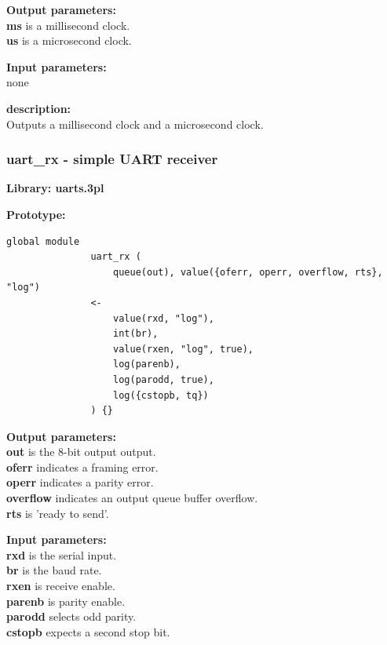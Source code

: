             {\bf Output parameters:} \\
            {\bf ms} is a millisecond clock.\\
            {\bf us} is a microsecond clock.

            {\bf Input parameters:} \\            
            none           

            {\bf description:} \\
            Outputs a millisecond clock and a microsecond clock.




        \subsubsection{uart\_rx - simple UART receiver}\label{sec:lmsuartrx}

            {\bf Library: uarts.3pl}

            {\bf Prototype:} \\
            \vsp
            \begin{lstlisting}[gobble=12, language=threepl]
               global module
               uart_rx (
                   queue(out), value({oferr, operr, overflow, rts}, "log")
               <-
                   value(rxd, "log"),
                   int(br),
                   value(rxen, "log", true),
                   log(parenb),
                   log(parodd, true),
                   log({cstopb, tq})
               ) {}
            \end{lstlisting}

            {\bf Output parameters:} \\
            {\bf out} is the 8-bit output output.\\
            {\bf oferr} indicates a framing error.\\
            {\bf operr} indicates a parity error.\\
            {\bf overflow} indicates an output queue buffer overflow.\\
            {\bf rts} is 'ready to send'.

            {\bf Input parameters:} \\
            {\bf rxd} is the serial input.\\
            {\bf br} is the baud rate.\\
            {\bf rxen} is receive enable.\\
            {\bf parenb} is parity enable.\\
            {\bf parodd} selects odd parity.\\
            {\bf cstopb} expects a second stop bit.

